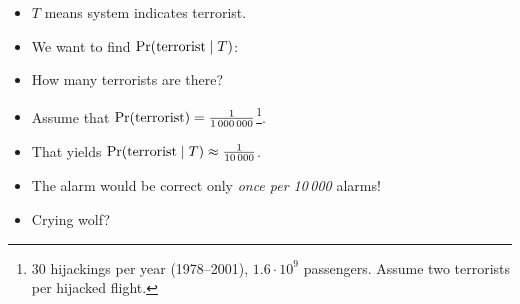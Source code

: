\begin{frame}
  \begin{solution}
    \begin{itemize}
      \item \(T\) means system indicates terrorist.
      \item We want to find \(\Pr(\text{terrorist}\mid T)\):
    \end{itemize}
  \end{solution}
\end{frame}

\begin{frame}
  \begin{remark}
    \begin{itemize}
      \item How many terrorists are there?
      \item Assume that \(\Pr(\text{terrorist}) = \frac{1}{1\,000\,000}\)\footnote{%
          30 hijackings per year (1978--2001), \(1.6\cdot 10^{9}\) passengers.
          Assume two terrorists per hijacked flight.
        }.

        \pause

      \item That yields \(\Pr(\text{terrorist}\mid T) \approx \frac{1}{10\,000}\).
      \item The alarm would be correct only \emph{once per 10\,000} alarms!
      \item Crying wolf?
    \end{itemize}
  \end{remark}
\end{frame}



